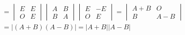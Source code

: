 \documentclass[UTF8,12pt,a4paper,fontset=fandol]{ctexart}
\begin{document}
\begin{solve}
\begin{align*}
                & = \begin{vmatrix}
                        E & E \\
                        O & E
                    \end{vmatrix}
                \begin{vmatrix}
                    A & B \\
                    B & A
                \end{vmatrix}
                \begin{vmatrix}
                    E & -E \\
                    O & E
                \end{vmatrix}
                = \begin{vmatrix}
                        A+B & O   \\
                        B   & A-B
                    \end{vmatrix}    \\
                & =
                \lvert (A+B)(A-B) \rvert = \lvert A+B \rvert \lvert A-B \rvert
            \end{align*}
\end{solve}
\end{document}
